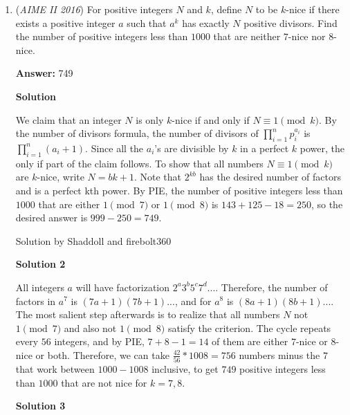 \begin{enumerate}
 $x = \frac{AT \cdot BS - 35}{13} = \frac{\frac{BC \cdot QT \cdot AC \cdot PS}{24} - 35}{13} = \frac{\frac{63 \cdot 35}{24} - 35}{13} = \frac{35(\frac{21}{8}) - 35}{13} = \frac{35(\frac{21}{8} - \frac{8}{8})}{13} = \frac{35 \cdot \frac{13}{8}}{13} = \frac{35}{8}$ so the answer is $35 + 8 = \boxed{043}$



	\item (\textit{AIME II 2016}) For positive integers $N$ and $k$, define $N$ to be $k$-nice if there exists a positive integer $a$ such that $a^{k}$ has exactly $N$ positive divisors. Find the number of positive integers less than $1000$ that are neither $7$-nice nor $8$-nice.


 
 \textbf{Answer: }749



\textbf{Solution}

We claim that an integer $N$ is only $k$-nice if and only if $N \equiv 1 \pmod k$. By the number of divisors formula, the number of divisors of $\prod_{i=1}^n p_i^{a_i}$ is $\prod_{i=1}^n (a_i+1)$. Since all the $a_i$'s are divisible by $k$ in a perfect $k$ power, the only if part of the claim follows. To show that all numbers $N \equiv 1 \pmod k$ are $k$-nice, write $N=bk+1$. Note that $2^{kb}$ has the desired number of factors and is a perfect kth power. By PIE, the number of positive integers less than $1000$ that are either $1 \pmod 7$ or $1\pmod 8$ is $143+125-18=250$, so the desired answer is $999-250=\boxed{749}$.

 Solution by Shaddoll and firebolt360

 



\textbf{Solution 2}

All integers $a$ will have factorization $2^a3^b5^c7^d...$. Therefore, the number of factors in $a^7$ is $(7a+1)(7b+1)...$, and for $a^8$ is $(8a+1)(8b+1)...$. The most salient step afterwards is to realize that all numbers $N$ not $1 \pmod{7}$ and also not $1 \pmod{8}$ satisfy the criterion. The cycle repeats every $56$ integers, and by PIE, $7+8-1=14$ of them are either $7$-nice or $8$-nice or both. Therefore, we can take $\frac{42}{56} * 1008 = 756$ numbers minus the $7$ that work between $1000-1008$ inclusive, to get $\boxed{749}$ positive integers less than $1000$ that are not nice for $k=7, 8$.

 



\textbf{Solution 3}


\end{enumerate}
